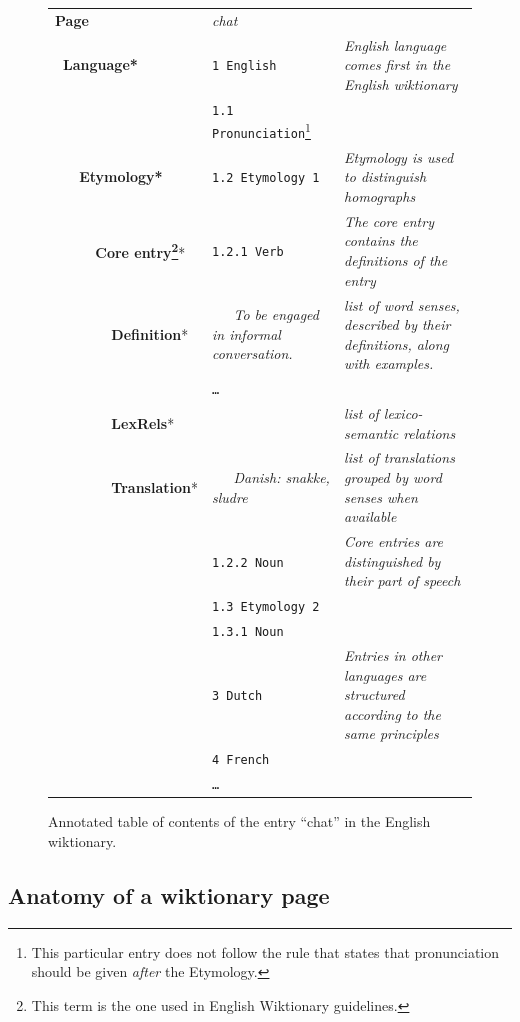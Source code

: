 \documentclass[10pt, a4paper]{article}
\begin{document}
\begin{figure}[htb]
\begin{graybox}
\scriptsize
\begin{tabularx}{\textwidth}{llX}
\textbf{Page}&\emph{chat}&\\
\textbf{~Language*}& \texttt{1 English}&\textit{English language comes first in the English wiktionary}\\
&\texttt{1.1 Pronunciation}\footnote{\scriptsize This particular entry does not follow the rule that states that pronunciation should be given \emph{after} the Etymology.}\\
\textbf{~~~Etymology*}&\texttt{1.2 Etymology 1}& \textit{Etymology is used to distinguish homographs}\\
\textbf{~~~~~Core entry\footnote{\scriptsize This term is the one used in English Wiktionary guidelines.}}*&\texttt{1.2.1 Verb}& \textit{The core entry contains the definitions of the entry}\\
\textbf{~~~~~~~Definition}*&\emph{~~~To be engaged in informal conversation.}& \textit{list of word senses, described by their definitions, along with examples.}\\
&\texttt{\ldots}&\\
\textbf{~~~~~~~LexRels}*& & \textit{list of lexico-semantic relations}\\
\textbf{~~~~~~~Translation}*&\emph{~~~Danish: snakke, sludre}& \textit{list of translations grouped by word senses when available}\\
&\texttt{1.2.2 Noun}&\textit{Core entries are distinguished by their part of speech}\\
&\texttt{1.3 Etymology 2}\\
&\texttt{1.3.1 Noun}\\
&\texttt{3 Dutch}&\textit{Entries in other languages are structured according to the same principles}\\
&\texttt{4 French}
\\
&\texttt{\ldots}&\\
\end{tabularx}
\end{graybox}
\caption{Annotated table of contents of the entry ``chat'' in the English wiktionary.}\label{englishEntry}
\end{figure}

\subsection{Anatomy of a wiktionary page}
\end{document}
